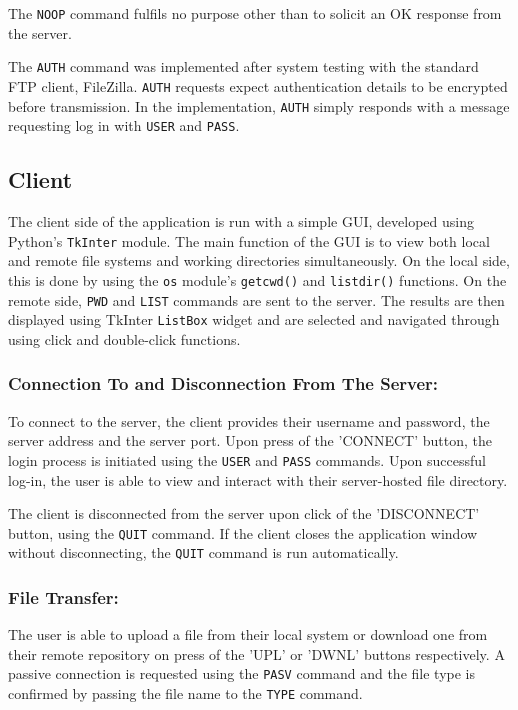 \documentclass[10pt,twocolumn]{witseiepaper}
\begin{document}
The \texttt{NOOP} command fulfils no purpose other than to solicit an OK response from the server.

The \texttt{AUTH} command was implemented after system testing with the standard FTP client, FileZilla. \texttt{AUTH} requests expect authentication details to be encrypted before transmission. In the implementation, \texttt{AUTH} simply responds with a message requesting log in with \texttt{USER} and \texttt{PASS}.

\subsection{Client}



The client side of the application is run with a simple GUI, developed using Python's \texttt{TkInter} module. The main function of the GUI is to view both local and remote file systems and working directories simultaneously. On the local side, this is done by using the \texttt{os} module's \texttt{getcwd()} and \texttt{listdir()} functions. On the remote side, \texttt{PWD} and \texttt{LIST} commands are sent to the server. The results are then displayed using TkInter \texttt{ListBox} widget and are selected and navigated through using click and double-click functions.

\vspace*{-2mm}
\subsubsection*{Connection To and Disconnection From The Server: }
To connect to the server, the client provides their username and password, the server address and the server port. Upon press of the 'CONNECT' button, the login process is initiated using the \texttt{USER} and \texttt{PASS} commands. Upon successful log-in, the user is able to view and interact with their server-hosted file directory.
 
The client is disconnected from the server upon click of the 'DISCONNECT' button, using the \texttt{QUIT} command. If the client closes the application window without disconnecting, the \texttt{QUIT} command is run automatically.

\vspace*{-2mm}
\subsubsection*{File Transfer: }
The user is able to upload a file from their local system or download one from their remote repository on press of the 'UPL' or 'DWNL' buttons respectively. A passive connection is requested using the \texttt{PASV} command and the file type is confirmed by passing the file name to the \texttt{TYPE} command.
\end{document}
